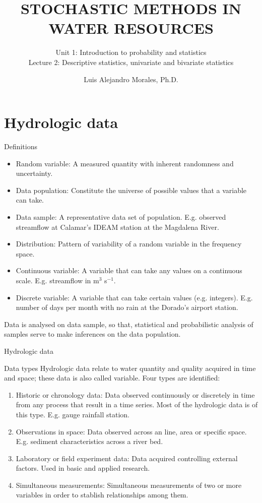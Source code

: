 \documentclass[8pt]{beamer}
\title{STOCHASTIC METHODS IN WATER RESOURCES}
\subtitle{Unit 1: Introduction to probability and statistics \\ Lecture 2: Descriptive statistics, univariate and bivariate statistics}
\author{Luis Alejandro Morales, Ph.D.}
\institute{Universidad Nacional de Colombia \\ Department of Civil and Agriculture Engineering} %
\renewcommand{\emph}[1]{\textcolor{myorange}{#1}}
\begin{document}
\begin{frame}
    \titlepage
\end{frame}

\section{Hydrologic data}

\begin{frame}{Definitions}
    \begin{itemize}
        \item \alert{Random variable}: A measured quantity with inherent randomness and uncertainty.
        \item \alert{Data population}:  Constitute the universe of possible values that a variable can take.
        \item \alert{Data sample}: A representative data set of population. E.g. observed streamflow at Calamar's IDEAM station at the Magdalena River.
        \item \alert{Distribution}: Pattern of variability of a random variable in the frequency space. 
        \item \alert{Continuous variable}: A variable that can take any values on a continuous scale. E.g. streamflow in m$^3$ s$^{-1}$.
        \item \alert{Discrete variable}: A variable that can take certain values (e.g. integers). E.g. number of days per month with no rain at the Dorado's airport station.
       
    \end{itemize}

    Data is analysed on \alert{data sample}, so that, \emph{statistical and probabilistic analysis} of samples serve to make \alert{inferences} on the data population.
\end{frame}
\begin{frame}{Hydrologic data}
    \begin{block}{Data types}
        Hydrologic data relate to water quantity and quality acquired in time and space; these data is also called \alert{variable}. Four types are identified:
        \begin{enumerate}
            \item \alert{Historic or chronology data}: Data observed continuously or discretely in time from any process that result in a time series. Most of the hydrologic data is of this type. E.g. gauge rainfall station. 
            \item \alert{Observations in space}: Data observed across an line, area or specific space. E.g. sediment characteristics across a river bed.
            \item \alert{Laboratory or field experiment data}: Data acquired controlling external factors. Used in basic and applied research. 
            \item \alert{Simultaneous measurements}: Simultaneous measurements of two or more variables in order to stablish relationships among them.
        \end{enumerate}
    \end{block}    
\end{frame}
\end{document}
